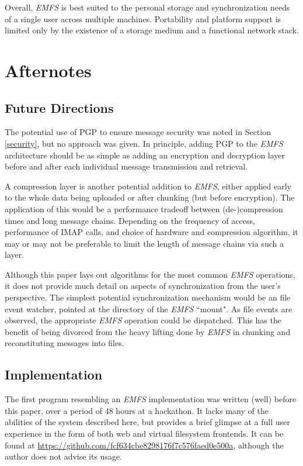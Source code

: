 \documentclass[12pt]{article}
\begin{document}
Overall, \textit{EMFS} is best suited to the personal storage and
synchronization needs of a single user across multiple machines. Portability
and platform support is limited only by the existence of a storage medium and
a functional network stack.

\section{Afternotes}

\subsection{Future Directions}

The potential use of PGP to ensure message security was noted in Section
\ref{security}, but no approach was given. In principle, adding PGP to the
\textit{EMFS} architecture should be as simple as adding an encryption and
decryption layer before and after each individual message transmission and
retrieval.

A compression layer is another potential addition to \textit{EMFS}, either
applied early to the whole data being uploaded or after chunking (but before
encryption). The application of this would be a performance tradeoff between
(de-)compression times and long message chains. Depending on the frequency of
access, performance of IMAP calls, and choice of hardware and compression
algorithm, it may or may not be preferable to limit the length of message
chains via such a layer.

Although this paper lays out algorithms for the most common \textit{EMFS}
operations, it does not provide much detail on aspects of synchronization
from the user's perspective. The simplest potential synchronization mechanism
would be an file event watcher, pointed at the directory of the \textit{EMFS}
``mount". As file events are observed, the appropriate \textit{EMFS} operation
could be dispatched. This has the benefit of being divorced from the
heavy lifting done by \textit{EMFS} in chunking and reconstituting messages
into files.

\subsection{Implementation}

The first program resembling an \textit{EMFS} implementation was written (well)
before this paper, over a period of 48 hours at a hackathon. It lacks many of
the abilities of the system described here, but provides a brief glimpse at a
full user experience in the form of both web and virtual filesystem frontends.
It can be found at \url{https://github.com/fcf634cbe8298176f7c576faed0e500a},
although the author does not advise its usage.
\end{document}
